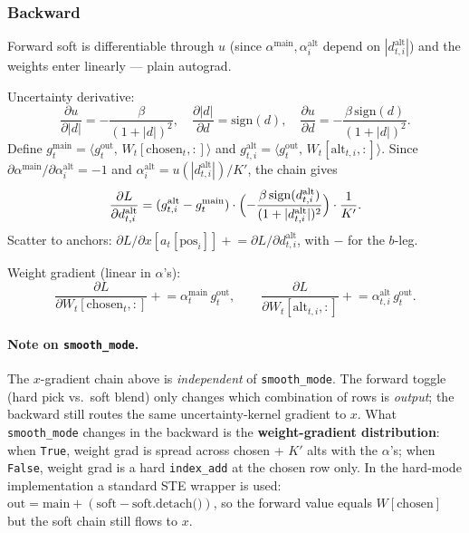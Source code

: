 \documentclass[11pt]{article}
\begin{document}
\subsubsection{Backward}\label{sec:can-bwd}

Forward soft is differentiable through $u$ (since $\alpha^{\mathrm{main}},\alpha^{\mathrm{alt}}_i$
depend on $|d_{t,i}^{\mathrm{alt}}|$) and the weights enter linearly --- plain
autograd.

Uncertainty derivative:
\[
  \frac{\partial u}{\partial |d|} = -\frac{\beta}{(1+|d|)^2},\quad
  \frac{\partial |d|}{\partial d} = \mathrm{sign}(d),\quad
  \frac{\partial u}{\partial d} = -\frac{\beta\,\mathrm{sign}(d)}{(1+|d|)^2}.
\]
Define $g_t^{\mathrm{main}}=\langle g^{\mathrm{out}}_t,\,W_t[\mathrm{chosen}_t,:]\rangle$ and
$g_{t,i}^{\mathrm{alt}}=\langle g^{\mathrm{out}}_t,\,W_t[\mathrm{alt}_{t,i},:]\rangle$.
Since $\partial\alpha^{\mathrm{main}}/\partial\alpha^{\mathrm{alt}}_i=-1$ and
$\alpha^{\mathrm{alt}}_i=u(|d_{t,i}^{\mathrm{alt}}|)/K'$, the chain gives
\[
  \frac{\partial L}{\partial d_{t,i}^{\mathrm{alt}}}
  = (g_{t,i}^{\mathrm{alt}}-g_t^{\mathrm{main}})\cdot
    \Bigl(-\frac{\beta\,\mathrm{sign}(d_{t,i}^{\mathrm{alt}})}{(1+|d_{t,i}^{\mathrm{alt}}|)^2}\Bigr)\cdot\frac{1}{K'}.
\]
Scatter to anchors: $\partial L/\partial x[a_t[\mathrm{pos}_i]]\mathrel{+}=
\partial L/\partial d_{t,i}^{\mathrm{alt}}$, with $-$ for the $b$-leg.

Weight gradient (linear in $\alpha$'s):
\[
  \frac{\partial L}{\partial W_t[\mathrm{chosen}_t,:]}\mathrel{+}=\alpha_t^{\mathrm{main}}\,g^{\mathrm{out}}_t,
  \qquad
  \frac{\partial L}{\partial W_t[\mathrm{alt}_{t,i},:]}\mathrel{+}=\alpha_{t,i}^{\mathrm{alt}}\,g^{\mathrm{out}}_t.
\]

\paragraph{Note on \texttt{smooth\_mode}.} The $x$-gradient chain above is
\emph{independent} of \texttt{smooth\_mode}. The forward toggle (hard pick
vs.\ soft blend) only changes which combination of rows is \emph{output};
the backward still routes the same uncertainty-kernel gradient to $x$.
What \texttt{smooth\_mode} changes in the backward is the
\textbf{weight-gradient distribution}: when \texttt{True}, weight grad is
spread across chosen + $K'$ alts with the $\alpha$'s; when \texttt{False},
weight grad is a hard \texttt{index\_add} at the chosen row only. In the
hard-mode implementation a standard STE wrapper is used:
$\text{out} = \text{main} + (\text{soft} - \text{soft.detach()})$, so the
forward value equals $W[\mathrm{chosen}]$ but the soft chain still flows to
$x$.
\end{document}
